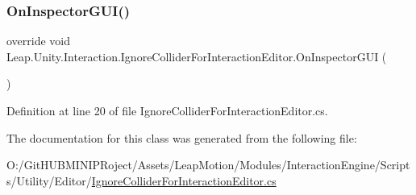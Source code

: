 \subsubsection{\texorpdfstring{OnInspectorGUI()}{OnInspectorGUI()}}
{\footnotesize\ttfamily override void Leap.\+Unity.\+Interaction.\+Ignore\+Collider\+For\+Interaction\+Editor.\+On\+Inspector\+G\+UI (\begin{DoxyParamCaption}{ }\end{DoxyParamCaption})}



Definition at line 20 of file Ignore\+Collider\+For\+Interaction\+Editor.\+cs.



The documentation for this class was generated from the following file\+:\begin{DoxyCompactItemize}
\item 
O\+:/\+Git\+H\+U\+B\+M\+I\+N\+I\+P\+Roject/\+Assets/\+Leap\+Motion/\+Modules/\+Interaction\+Engine/\+Scripts/\+Utility/\+Editor/\mbox{\hyperlink{_ignore_collider_for_interaction_editor_8cs}{Ignore\+Collider\+For\+Interaction\+Editor.\+cs}}\end{DoxyCompactItemize}
